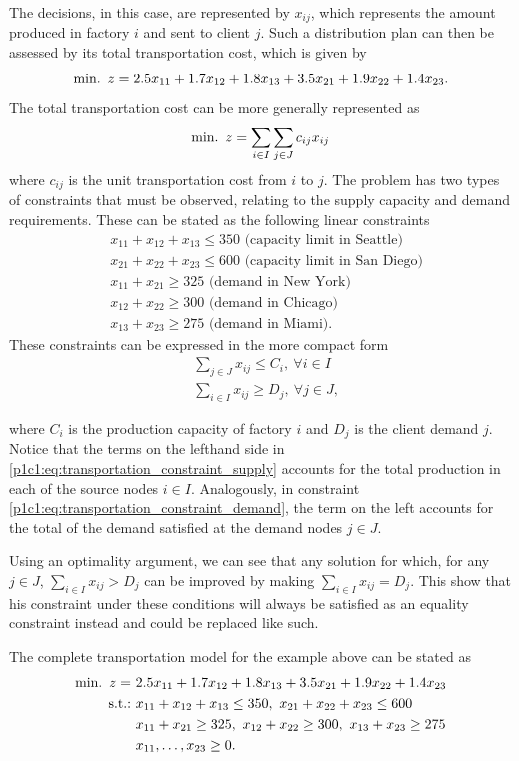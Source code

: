 The decisions, in this case, are represented by $x_{ij}$, which represents the amount produced in factory $i$ and sent to client $j$. Such a distribution plan can then be assessed by its total transportation cost, which is given by
%
$$ 
\mathop{\text{min.~}} z = 2.5x_{11} + 1.7x_{12} + 1.8x_{13} + 3.5x_{21} + 1.9x_{22} + 1.4x_{23}.
$$
%
The total transportation cost can be more generally represented as
%
$$
\mathop{\text{min.~}} z = \sum_{i \in I}\sum_{j \in J}c_{ij}x_{ij}
$$
%
where $c_{ij}$ is the unit transportation cost from $i$ to $j$.
%
The problem has two types of constraints that must be observed, relating to the supply capacity and demand requirements. These can be stated as the following linear constraints
%
\begin{align*}
	& x_{11} + x_{12} + x_{13} \leq 350 \text{ (capacity limit in Seattle)}\\
	& x_{21} + x_{22} + x_{23} \leq 600 \text{ (capacity limit in San Diego)}\\
	& x_{11} + x_{21} \geq 325 \text{ (demand in New York)}\\
	& x_{12} + x_{22} \geq 300 \text{ (demand in Chicago)}\\
	& x_{13} + x_{23} \geq 275 \text{ (demand in Miami)}.
\end{align*}
%
These constraints can be expressed in the more compact form
%
\begin{align}
	& \sum_{j \in J} x_{ij} \leq C_i, ~\forall i \in I \label{p1c1:eq:transportation_constraint_supply}\\
	& \sum_{i \in I} x_{ij} \geq D_j, ~\forall j \in J, \label{p1c1:eq:transportation_constraint_demand}
\end{align}

where $C_i$ is the production capacity of factory $i$ and $D_j$ is the client demand $j$. Notice that the terms on the lefthand side in \eqref{p1c1:eq:transportation_constraint_supply} accounts for the total production in each of the source nodes $i \in I$. Analogously, in constraint \eqref{p1c1:eq:transportation_constraint_demand}, the term on the left accounts for the total of the demand satisfied at the demand nodes $j \in J$. 

Using an optimality argument, we can see that any solution for which, for any $j \in J$, $\sum_{i \in I} x_{ij} > D_j$ can be improved by making $\sum_{i \in I} x_{ij} = D_j$. This show that his constraint under these conditions will always be satisfied as an equality constraint instead and could be replaced like such. 

The complete transportation model for the example above can be stated as 
%
\begin{align*}
	\mini z = \ &2.5x_{11} + 1.7x_{12} + 1.8x_{13} + 3.5x_{21} + 1.9x_{22} + 1.4x_{23} \\
	\st & x_{11} + x_{12} + x_{13} \leq 350, \ 
	x_{21} + x_{22} + x_{23} \leq 600\\
	& x_{11} + x_{21} \geq 325, \ x_{12} + x_{22} \geq 300, \ x_{13} + x_{23} \geq 275\\
	& x_{11}, \dots, x_{23} \geq 0.
\end{align*}
%

